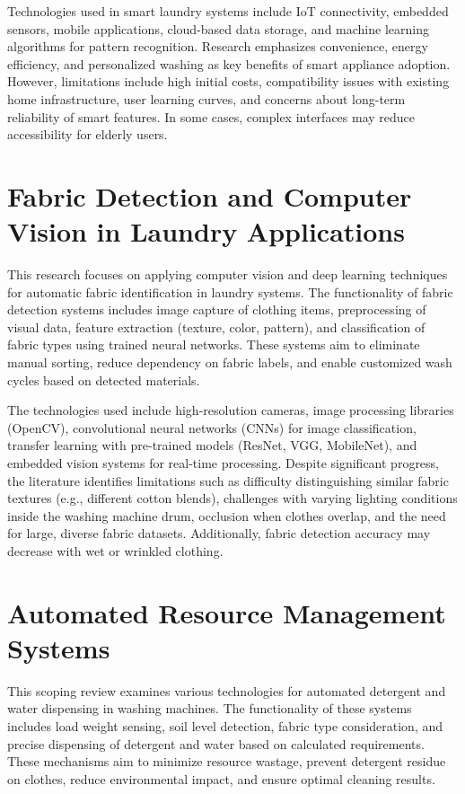 \noindent
Technologies used in smart laundry systems include IoT connectivity, embedded sensors, mobile applications, cloud-based data storage, and machine learning algorithms for pattern recognition. Research emphasizes convenience, energy efficiency, and personalized washing as key benefits of smart appliance adoption. However, limitations include high initial costs, compatibility issues with existing home infrastructure, user learning curves, and concerns about long-term reliability of smart features. In some cases, complex interfaces may reduce accessibility for elderly users.

\section{Fabric Detection and Computer Vision in Laundry Applications}

This research focuses on applying computer vision and deep learning techniques for automatic fabric identification in laundry systems. The functionality of fabric detection systems includes image capture of clothing items, preprocessing of visual data, feature extraction (texture, color, pattern), and classification of fabric types using trained neural networks. These systems aim to eliminate manual sorting, reduce dependency on fabric labels, and enable customized wash cycles based on detected materials.

\noindent
The technologies used include high-resolution cameras, image processing libraries (OpenCV), convolutional neural networks (CNNs) for image classification, transfer learning with pre-trained models (ResNet, VGG, MobileNet), and embedded vision systems for real-time processing. Despite significant progress, the literature identifies limitations such as difficulty distinguishing similar fabric textures (e.g., different cotton blends), challenges with varying lighting conditions inside the washing machine drum, occlusion when clothes overlap, and the need for large, diverse fabric datasets. Additionally, fabric detection accuracy may decrease with wet or wrinkled clothing.

\section{Automated Resource Management Systems}

This scoping review examines various technologies for automated detergent and water dispensing in washing machines. The functionality of these systems includes load weight sensing, soil level detection, fabric type consideration, and precise dispensing of detergent and water based on calculated requirements. These mechanisms aim to minimize resource wastage, prevent detergent residue on clothes, reduce environmental impact, and ensure optimal cleaning results.

